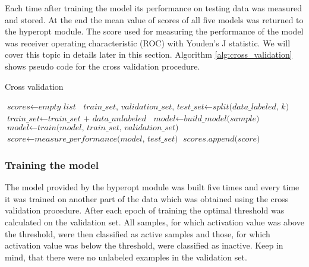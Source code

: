 \documentclass[a4paper,10pt]{report}
\begin{document}
	Each time after training the model its performance on testing data was measured and stored. At the end the mean value of scores of all five models was returned to the hyperopt module. The score used for measuring the performance of the model was receiver operating characteristic (ROC) with Youden's J statistic. We will cover this topic in details later in this section. Algorithm \ref{alg:cross_validation} shows pseudo code for the cross validation procedure. 
	
	\begin{algorithm}
	\caption{Cross validation}\label{alg:cross_validation}
	\begin{algorithmic}[1]
	\State
	\State $\textit{scores} \gets \textit{empty list}$
	\State
	  \State $\textit{train\_set, validation\_set, test\_set} \gets \textit{split(data\_labeled, k)} $
	  \State $\textit{train\_set} \gets \textit{train\_set + data\_unlabeled}$
	  \State $\textit{model} \gets \textit{build\_model(sample)}$
	  \State $\textit{model} \gets \textit{train(model, train\_set, validation\_set)}$
	  \State $\textit{score} \gets \textit{measure\_performance(model, test\_set)}$
	  \State $\textit{scores.append(score)}$
	\EndFor
	\State       
	\State
	\EndProcedure
	\end{algorithmic}
	\end{algorithm}
	
	\subsubsection{Training the model}
	The model provided by the hyperopt module was built five times and every time it was trained on another part of the data which was obtained using the cross validation procedure. After each epoch of training the optimal threshold was calculated on the validation set. All samples, for which activation value was above the threshold, were then classified as active samples and those, for which activation value was below the threshold, were classified as inactive. Keep in mind, that there were no unlabeled examples in the validation set. 
	
\end{document}
